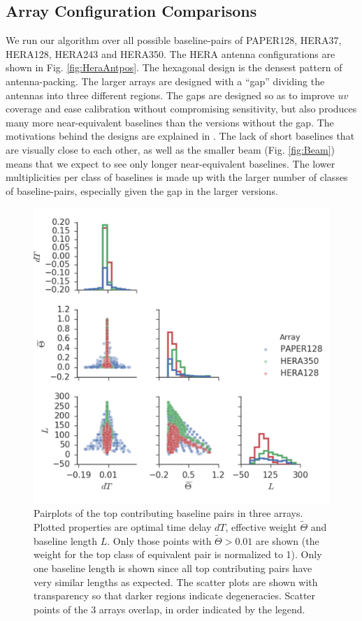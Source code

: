 \documentclass[twocolumn,apj,numberedappendix]{emulateapj}
\renewcommand\[{\begin{equation}}
\renewcommand\]{\end{equation}}
\begin{document}
\subsection{Array Configuration Comparisons \label{sec:arrconf}}
We run our algorithm over all possible baseline-pairs of  PAPER128, HERA37, HERA128, HERA243 and HERA350. The HERA antenna configurations are shown in Fig. \ref{fig:HeraAntpos}. The  
hexagonal design is the densest pattern of antenna-packing. The larger arrays are designed with a ``gap'' dividing the antennas into three different regions. The gaps are designed so as to improve $uv$ coverage and ease calibration without compromising sensitivity, but also produces many more near-equivalent baselines than the versions without the gap. The motivations behind the designs are explained in \cite{HERAconfiguration}.  The lack of short baselines that are visually close to each other, as well as the smaller beam (Fig. \ref{fig:Beam}) means that we expect to see only longer near-equivalent baselines. The lower multiplicities per class of baselines is made up with the larger number of classes of baseline-pairs, especially given the gap in the larger versions. 

\begin{figure}[H]
\includegraphics[width=\linewidth]{pairplot_small}

\caption{Pairplots of the top contributing baseline pairs in three arrays. Plotted properties are optimal time delay $dT$,  effective weight $\widetilde{\Theta}$ and baseline length $L$. Only those points with $\widetilde{\Theta}>0.01$ are shown (the weight for the top class of equivalent pair is normalized to 1). Only one baseline length is shown since all top contributing pairs have very similar lengths as expected. The scatter plots are shown with transparency so that darker regions indicate degeneracies. Scatter points of the 3 arrays overlap, in order indicated by the legend. }
\label{fig:pairplot}
\end{figure}
\end{document}
